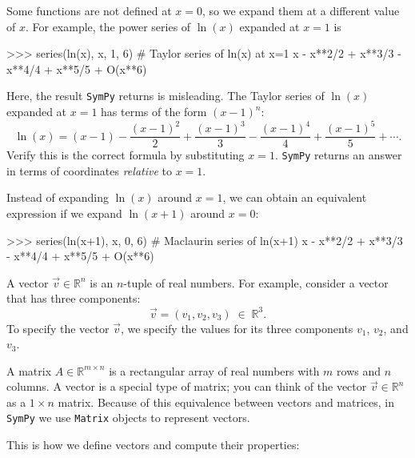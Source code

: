 \noindent
Some functions are not defined at $x=0$, so we expand them at a different value of $x$.
For example, the power series of $\ln(x)$ expanded at $x=1$ is

\small
\begin{verbatimtab}
>>> series(ln(x), x, 1, 6)     # Taylor series of ln(x) at x=1
x - x**2/2 + x**3/3 - x**4/4 + x**5/5  + O(x**6)    
\end{verbatimtab}
\normalsize

\noindent
Here, the result \texttt{SymPy} returns is misleading.
The Taylor series of $\ln(x)$ expanded at $x=1$ has terms of the form $(x-1)^n$:
\[
  \ln(x) = (x-1) - \frac{(x-1)^2}{2} + \frac{(x-1)^3}{3} - \frac{(x-1)^4}{4} + \frac{(x-1)^5}{5} + \cdots.
\]
Verify this is the correct formula by substituting $x=1$.
\texttt{SymPy} returns an answer in terms of coordinates \emph{relative} to $x=1$.

Instead of expanding $\ln(x)$ around $x=1$,
we can obtain an equivalent expression if we expand $\ln(x+1)$ around $x=0$:



\small
\begin{verbatimtab}
>>> series(ln(x+1), x, 0, 6)   # Maclaurin series of ln(x+1)
x - x**2/2 + x**3/3 - x**4/4 + x**5/5 + O(x**6)
\end{verbatimtab}
\normalsize




\label{sec:sympytut_vectors}

A vector $\vec{v} \in \mathbb{R}^n$ is an $n$-tuple of real numbers. 										
For example, consider a vector that has three components:  
\[
 \vec{v} = (v_1,v_2,v_3) \;  \in \; \mathbb{R}^3.
\]
To specify the vector $\vec{v}$, 
we specify the values for its three components $v_1$, $v_2$, and $v_3$. 

A matrix $A \in \mathbb{R}^{m\times n}$ is a rectangular array of real numbers with $m$ rows and $n$ columns.
A vector is a special type of matrix;
you can think of the vector $\vec{v}\in \mathbb{R}^n$ as a $1\times n$ matrix.
Because of this equivalence between vectors and matrices,
 in \texttt{SymPy} we use \texttt{Matrix} objects to represent vectors.

This is how we define vectors and compute their properties:											
																						
